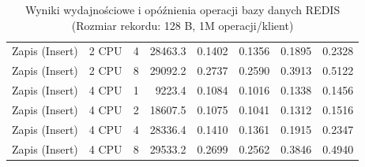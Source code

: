 \begin{table}[ht]
{\begin{tabular}{llcrrrrr}
Zapis (Insert) & 2 CPU & 4 & 28463.3 & 0.1402 & 0.1356 & 0.1895 & 0.2328 \\
Zapis (Insert) & 2 CPU & 8 & 29092.2 & 0.2737 & 0.2590 & 0.3913 & 0.5122 \\
Zapis (Insert) & 4 CPU & 1 & 9223.4 & 0.1084 & 0.1016 & 0.1338 & 0.1456 \\
Zapis (Insert) & 4 CPU & 2 & 18607.5 & 0.1075 & 0.1041 & 0.1312 & 0.1516 \\
Zapis (Insert) & 4 CPU & 4 & 28336.4 & 0.1410 & 0.1361 & 0.1915 & 0.2347 \\
Zapis (Insert) & 4 CPU & 8 & 29533.2 & 0.2699 & 0.2562 & 0.3846 & 0.4940 \\
\bottomrule
\end{tabular}%
}
\caption{Wyniki wydajnościowe i opóźnienia operacji bazy danych REDIS (Rozmiar rekordu: 128 B, 1M operacji/klient)}
\label{tab:latency_redis_small_1000000}
\end{table}
